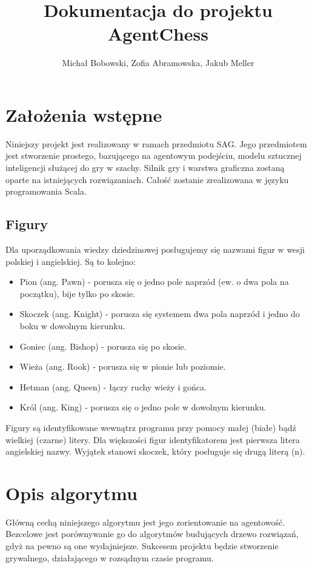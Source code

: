 \documentclass[a4paper,12pt,oneside,notitlepage,onecolumn]{article}
\author{Michał Bobowski, Zofia Abramowska, Jakub Meller}
\title{Dokumentacja do projektu AgentChess}
\begin{document}
  \maketitle
\section{Założenia wstępne}
Niniejszy projekt jest realizowany w ramach przedmiotu SAG.
Jego przedmiotem jest stworzenie prostego, bazującego na agentowym podejściu, modelu sztucznej inteligencji służącej do gry w szachy.
Silnik gry i warstwa graficzna zostaną oparte na istniejących rozwiązaniach.
Całość zostanie zrealizowana w języku programowania Scala.

\subsection{Figury}
Dla uporządkowania wiedzy dziedzinowej posługujemy się nazwami figur w wesji polskiej i angielskiej.
Są to kolejno:
\begin{itemize}
 \item Pion (ang. Pawn) - porusza się o jedno pole naprzód (ew. o dwa pola na początku), bije tylko po skosie.
 \item Skoczek (ang. Knight) - porusza się systemem dwa pola naprzód i jedno do boku w dowolnym kierunku.
 \item Goniec (ang. Bishop) - porusza się po skosie.
 \item Wieża (ang. Rook) - porusza się w pionie lub poziomie.
 \item Hetman (ang. Queen) - łączy ruchy wieży i gońca.
 \item Król (ang. King) - porusza się o jedno pole w dowolnym kierunku.
\end{itemize}

Figury są identyfikowane wewnątrz programu przy pomocy małej (białe) bądź wielkiej (czarne) litery.
Dla większości figur identyfikatorem jest pierwsza litera angielskiej nazwy.
Wyjątek stanowi skoczek, który posługuje się drugą literą (n).

\section{Opis algorytmu}
Główną cechą niniejszego algorytmu jest jego zorientowanie na agentowość.
Bezcelowe jest porównywanie go do algorytmów budujących drzewo rozwiązań, gdyż na pewno są one wydajniejsze.
Sukcesem projektu będzie stworzenie grywalnego, działającego w rozsądnym czasie programu.
\end{document}
